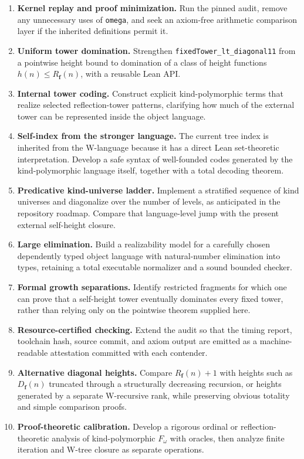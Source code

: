 \documentclass[11pt]{article}
\theoremstyle{definition}
\theoremstyle{remark}
\newcommand{\Rfam}{\ensuremath{R_{\mathbf f}}}
\newcommand{\Dfam}{\ensuremath{D_{\mathbf f}}}
\newcommand{\code}[1]{\texttt{#1}}
\begin{document}
\begin{enumerate}[leftmargin=*]
\item \textbf{Kernel replay and proof minimization.} Run the pinned audit,
  remove any unnecessary uses of \code{omega}, and seek an axiom-free arithmetic
  comparison layer if the inherited definitions permit it.
\item \textbf{Uniform tower domination.} Strengthen
  \code{fixedTower\_lt\_diagonal11} from a pointwise height bound to domination
  of a class of height functions $h(n)\le\Rfam(n)$, with a reusable Lean API.
\item \textbf{Internal tower coding.} Construct explicit kind-polymorphic terms
  that realize selected reflection-tower patterns, clarifying how much of the
  external tower can be represented inside the object language.
\item \textbf{Self-index from the stronger language.} The current tree index is
  inherited from the W-language because it has a direct Lean set-theoretic
  interpretation. Develop a safe syntax of well-founded codes generated by the
  kind-polymorphic language itself, together with a total decoding theorem.
\item \textbf{Predicative kind-universe ladder.} Implement a stratified sequence
  of kind universes and diagonalize over the number of levels, as anticipated
  in the repository roadmap. Compare that language-level jump with the present
  external self-height closure.
\item \textbf{Large elimination.} Build a realizability model for a carefully
  chosen dependently typed object language with natural-number elimination into
  types, retaining a total executable normalizer and a sound bounded checker.
\item \textbf{Formal growth separations.} Identify restricted fragments for
  which one can prove that a self-height tower eventually dominates every fixed
  tower, rather than relying only on the pointwise theorem supplied here.
\item \textbf{Resource-certified checking.} Extend the audit so that the timing
  report, toolchain hash, source commit, and axiom output are emitted as a
  machine-readable attestation committed with each contender.
\item \textbf{Alternative diagonal heights.} Compare $\Rfam(n)+1$ with heights
  such as $\Dfam(n)$ truncated through a structurally decreasing recursion,
  or heights generated by a separate W-recursive rank, while preserving obvious
  totality and simple comparison proofs.
\item \textbf{Proof-theoretic calibration.} Develop a rigorous ordinal or
  reflection-theoretic analysis of kind-polymorphic $F_\omega$ with oracles,
  then analyze finite iteration and W-tree closure as separate operations.
\end{enumerate}
\end{document}
